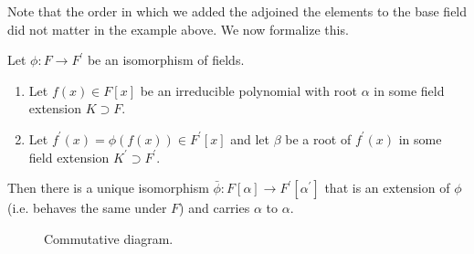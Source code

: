   Note that the order in which we added the adjoined the elements to the base field did not matter in the example above. We now formalize this. 

  \begin{theorem}
    \label{thm:extending_field_iso}
    Let $\phi: F \to F^\prime$ be an isomorphism of fields.
    \begin{enumerate}
      \item Let $f(x) \in F[x]$ be an irreducible polynomial with root $\alpha$ in some field extension $K \supset F$.
      \item Let $f^\prime(x) = \phi(f(x)) \in F^\prime[x]$ and let $\beta$ be a root of $f^\prime(x)$ in some field extension $K^\prime \supset F^\prime$. 
    \end{enumerate}
    Then there is a unique isomorphism $\bar{\phi} : F[\alpha] \to F^\prime [\alpha^\prime]$ that is an extension of $\phi$ (i.e. behaves the same under $F$) and carries $\alpha$ to $\alpha$. 
    \begin{figure}[H]
      \centering 
      \caption{Commutative diagram.} 
      \label{fig:field_isomorphism_extension}
    \end{figure}
  \end{theorem}
